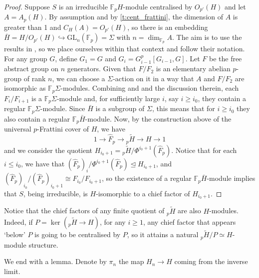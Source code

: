 \documentclass[10pt,a4paper]{amsart}
\begin{document}
\begin{proof} 
    Suppose $S$ is an irreducible $\mathbb F_pH$-module centralised by $O_{p'}(H)$ and let $A=A_p(H)$. By assumption and by \cref{t:cent_frattini}, the dimension of $A$ is greater than 1 and $C_H(A)=O_{p'}(H)$, so there is an embedding $\bar{H}=H/O_{p'}(H) \hookrightarrow \mathrm{GL}_n(\mathbb F_p)=\Sigma$ with $n=\dim_{\mathbb F_p}A$. The aim is to use the results in \cite{BK}, so we place ourselves within that context and follow their notation. For any group $G$, define $G_1 = G$ and $G_i = G_{i-1}^p[G_{i-1},G]$. Let $F$ be the free abstract group on $n$ generators. Given that $F/F_2$ is an elementary abelian $p$-group of rank $n$, we can choose a $\Sigma$-action on it in a way that $A$ and $F/F_2$ are isomorphic as $\mathbb F_p\Sigma$-modules. Combining \cite[Theorem 2]{BK} and \cite[Theorem 3]{BK} and the discussion therein, each $F_i/F_{i+1}$ is a $\mathbb F_p\Sigma$-module and, for sufficiently large $i$, say $i \geq i_0$, they contain a regular $\mathbb F_p \Sigma$-module. Since $\bar{H}$ is a subgroup of $\Sigma$, this means that for $i \geq i_0$ they also contain a regular $\mathbb F_p\bar{H}$-module. Now, by the construction above of the universal $p$-Frattini cover of $H$, we have
    \[1 \rightarrow \widehat{F}_p \rightarrow {}_p\widetilde H \rightarrow H \rightarrow 1\]
    and we consider the quotient $H_{i_0+1} = {}_p\widetilde H/\Phi^{i_0+1}(\widehat F_p)$. Notice that for each $i\leq i_0$, we have that $(\widehat{F}_p)_{i}/\Phi^{i_0+1}(\widehat{F}_p) \unlhd H_{i_0+1}$, and $(\widehat F_p)_{i_0}/(\widehat{F}_p)_{i_0+1} \cong F_{i_0}/F_{i_0+1}$, so the existence of a regular $\mathbb F_p \bar{H}$-module implies that $S$, being irreducible, is $H$-isomorphic to a chief factor of $H_{i_0+1}$.
\end{proof}

Notice that the chief factors of any finite quotient of ${}_p\widetilde H$ are also $H$-modules. Indeed, if $P = \ker ({}_p\widetilde H \to H)$, for any $i\geq 1$, any chief factor that appears `below' $P$ is going to be centralised by $P$, so it attains a natural ${}_p\widetilde H/P \simeq H$-module structure.

We end with a lemma. Denote by $\pi_n$ the map $H_n \to H$ coming from the inverse limit.
\end{document}
